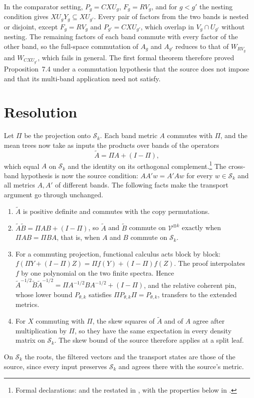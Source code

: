 \documentclass[11pt]{article}
\begin{document}
In the comparator setting, $P_g=CXU_g$, $F_g=RV_g$, and for $g<g'$ the nesting
condition gives $XU_gY_g\subseteq XU_{g'}$. Every pair of factors from the two
bands is nested or disjoint, except $F_g=RV_g$ and $P_{g'}=CXU_{g'}$, which
overlap in $V_g\cap U_{g'}$ without nesting. The remaining factors of each
band commute with every factor of the other band, so the full-space
commutation of $A_g$ and $A_{g'}$ reduces to that of $W_{RV_g}$ and
$W_{CXU_{g'}}$, which fails in general. The first formal theorem therefore proved
Proposition~7.4 under a commutation hypothesis that the source does not
impose and that its multi-band application need not satisfy.

\section{Resolution}

Let $\Pi$ be the projection onto $\mathcal S_k$. Each band metric $A$ commutes
with $\Pi$, and the mean trees now take as inputs the products over bands of
the operators
\[
  \widetilde A=\Pi A+(I-\Pi),
\]
which equal $A$ on $\mathcal S_k$ and the identity on its orthogonal
complement.\footnote{Formal declarations:
 and the restated
 in
, with the properties below
in .}
The cross-band hypothesis is now the source condition: $AA'w=A'Aw$ for every
$w\in\mathcal S_k$ and all metrics $A,A'$ of different bands. The following
facts make the transport argument go through unchanged.
\begin{enumerate}
\item $\widetilde A$ is positive definite and commutes with the copy
  permutations.
\item $\widetilde A\widetilde B=\Pi AB+(I-\Pi)$, so $\widetilde A$ and
  $\widetilde B$ commute on $\mathcal V^{\otimes k}$ exactly when
  $\Pi AB=\Pi BA$, that is, when $A$ and $B$ commute on $\mathcal S_k$.
\item For a commuting projection, functional calculus acts block by block:
  $f(\Pi Y+(I-\Pi)Z)=\Pi f(Y)+(I-\Pi)f(Z)$. The proof interpolates $f$ by one
  polynomial on the two finite spectra. Hence
  $\widetilde A^{-1/2}\widetilde B\widetilde A^{-1/2}
   =\Pi A^{-1/2}BA^{-1/2}+(I-\Pi)$, and the relative coherent pin, whose
  lower bound $P_{\theta,k}$ satisfies $\Pi P_{\theta,k}\Pi=P_{\theta,k}$,
  transfers to the extended metrics.
\item For $X$ commuting with $\Pi$, the skew squares of $\widetilde A$ and of
  $A$ agree after multiplication by $\Pi$, so they have the same expectation in
  every density matrix on $\mathcal S_k$. The skew bound of the source
  therefore applies at a split leaf.
\end{enumerate}
On $\mathcal S_k$ the roots, the filtered vectors and the transport states are
those of the source, since every input preserves $\mathcal S_k$ and agrees there
with the source's metric.
\end{document}
